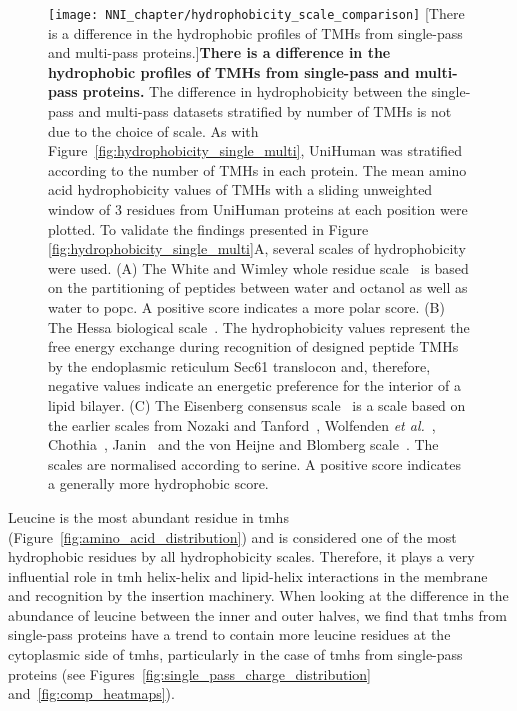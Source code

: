 \begin{figure}[!ht]
\centering
\texttt{[image: NNI\_chapter/hydrophobicity\_scale\_comparison]}
[There is a difference in the hydrophobic profiles of TMHs from single-pass and multi-pass proteins.]{\textbf{There is a difference in the hydrophobic profiles of TMHs from single-pass and multi-pass proteins.}
The difference in hydrophobicity between the single-pass and multi-pass datasets stratified by number of TMHs is not due to the choice of scale. As with Figure~\ref{fig:hydrophobicity_single_multi}, UniHuman was stratified according to the number of TMHs in each protein. The mean amino acid hydrophobicity values of TMHs with a sliding unweighted window of 3 residues from UniHuman proteins at each position were plotted. To validate the findings presented in Figure \ref{fig:hydrophobicity_single_multi}A, several scales of hydrophobicity were used. (A) The White and Wimley whole residue scale~\cite{White1999} is based on the partitioning of peptides between water and octanol as well as water to \gls{popc}. A positive score indicates a more polar score. (B) The Hessa biological scale~\cite{Hessa2005}. The hydrophobicity values represent the free energy exchange during recognition of designed peptide TMHs by the endoplasmic reticulum Sec61 translocon and, therefore, negative values indicate an energetic preference for the interior of a lipid bilayer. (C) The Eisenberg consensus scale~\cite{Eisenberg1984} is a scale based on the earlier scales from Nozaki and Tanford~\cite{Nozaki1971}, Wolfenden \textit{et al.}~\cite{Wolfenden1981}, Chothia~\cite{Chothia1976}, Janin~\cite{Janin1979} and the von Heijne and Blomberg scale~\cite{VonHeijne1979}. The scales are normalised according to serine. A positive score indicates a generally more hydrophobic score.}

\label{fig:hydrophobicity_scale_comparison}
\end{figure}

Leucine is the most abundant residue in \gls{tmh}s (Figure~\ref{fig:amino_acid_distribution}) and is considered one of the most hydrophobic residues by all hydrophobicity scales. Therefore, it plays a very influential role in \gls{tmh} helix-helix and lipid-helix interactions in the membrane and recognition by the insertion machinery. When looking at the difference in the abundance of leucine between the inner and outer halves, we find that \gls{tmh}s from single-pass proteins have a trend to contain more leucine residues at the cytoplasmic side of \gls{tmh}s, particularly in the case of \gls{tmh}s from single-pass proteins (see Figures~\ref{fig:single_pass_charge_distribution} and~\ref{fig:comp_heatmaps}).

